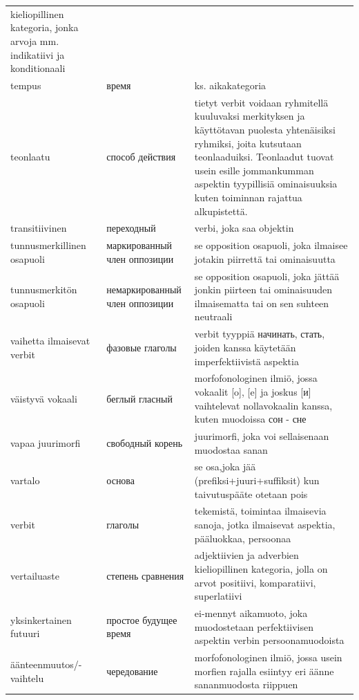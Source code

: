 \documentclass[]{scrreprt}
\begin{document}
\begin{longtable}[c]{p{4cm}p{4cm}p{7cm}}
kieliopillinen kategoria, jonka arvoja mm. indikatiivi ja
konditionaali\tabularnewline
tempus & время & ks. aikakategoria\tabularnewline
teonlaatu & способ действия & tietyt verbit voidaan ryhmitellä
kuuluvaksi merkityksen ja käyttötavan puolesta yhtenäisiksi ryhmiksi,
joita kutsutaan teonlaaduiksi. Teonlaadut tuovat usein esille
jommankumman aspektin tyypillisiä ominaisuuksia kuten toiminnan rajattua
alkupistettä.\tabularnewline
transitiivinen & переходный & verbi, joka saa objektin\tabularnewline
tunnusmerkillinen osapuoli & маркированный член оппозиции & se
opposition osapuoli, joka ilmaisee jotakin piirrettä tai
ominaisuutta\tabularnewline
tunnusmerkitön osapuoli & немаркированный член оппозиции & se opposition
osapuoli, joka jättää jonkin piirteen tai ominaisuuden ilmaisematta tai
on sen suhteen neutraali\tabularnewline
vaihetta ilmaisevat verbit & фазовые глаголы & verbit tyyppiä начинать,
стать, joiden kanssa käytetään imperfektiivistä aspektia\tabularnewline
väistyvä vokaali & беглый гласный & morfofonologinen ilmiö, jossa
vokaalit {[}o{]}, {[}e{]} ja joskus {[}и{]} vaihtelevat nollavokaalin
kanssa, kuten muodoissa сон - сне\tabularnewline
vapaa juurimorfi & свободный корень & juurimorfi, joka voi sellaisenaan
muodostaa sanan\tabularnewline
vartalo & основа & se osa,joka jää (prefiksi+juuri+suffiksit) kun
taivutuspääte otetaan pois\tabularnewline
verbit & глаголы & tekemistä, toimintaa ilmaisevia sanoja, jotka
ilmaisevat aspektia, pääluokkaa, persoonaa\tabularnewline
vertailuaste & степень сравнения & adjektiivien ja adverbien
kieliopillinen kategoria, jolla on arvot positiivi, komparatiivi,
superlatiivi\tabularnewline
yksinkertainen futuuri & простое будущее время & ei-mennyt aikamuoto,
joka muodostetaan perfektiivisen aspektin verbin
persoonamuodoista\tabularnewline
äänteenmuutos/-vaihtelu & чередование & morfofonologinen ilmiö, jossa usein morfien rajalla esiintyy eri äänne sananmuodosta riippuen\tabularnewline
\bottomrule
\end{longtable}
\end{document}
